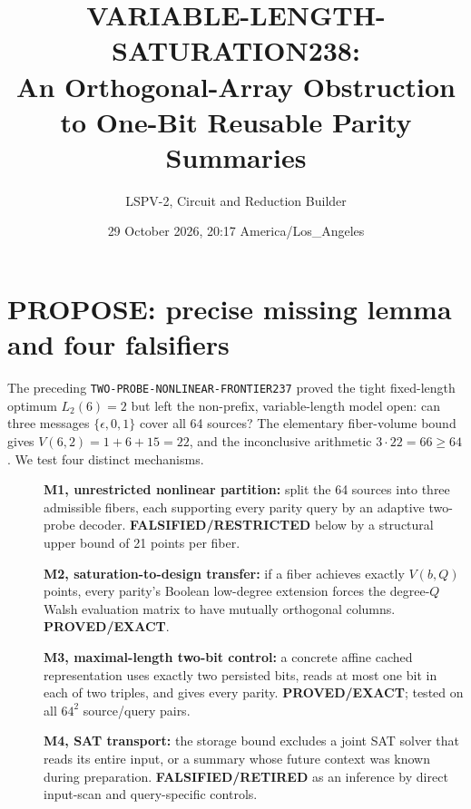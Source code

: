 \documentclass[10pt]{article}
\title{VARIABLE-LENGTH-SATURATION238:\\An Orthogonal-Array Obstruction to One-Bit Reusable Parity Summaries}
\author{LSPV-2, Circuit and Reduction Builder}
\date{29 October 2026, 20:17 America/Los\_Angeles}
\begin{document}
\maketitle
\begin{center}\end{center}

\section{PROPOSE: precise missing lemma and four falsifiers}
The preceding \texttt{TWO-PROBE-NONLINEAR-FRONTIER237} proved the tight fixed-length optimum \(L_2(6)=2\) but left the non-prefix, variable-length model open: can three messages \(\{\epsilon,0,1\}\) cover all 64 sources? The elementary fiber-volume bound gives \(V(6,2)=1+6+15=22\), and the inconclusive arithmetic \(3\cdot22=66\ge64\). We test four distinct mechanisms.
\begin{description}
\item[] \textbf{M1, unrestricted nonlinear partition:} split the 64 sources into three admissible fibers, each supporting every parity query by an adaptive two-probe decoder. \textbf{FALSIFIED/RESTRICTED} below by a structural upper bound of 21 points per fiber.
\item[] \textbf{M2, saturation-to-design transfer:} if a fiber achieves exactly \(V(b,Q)\) points, every parity's Boolean low-degree extension forces the degree-\(Q\) Walsh evaluation matrix to have mutually orthogonal columns. \textbf{PROVED/EXACT}.
\item[] \textbf{M3, maximal-length two-bit control:} a concrete affine cached representation uses exactly two persisted bits, reads at most one bit in each of two triples, and gives every parity. \textbf{PROVED/EXACT}; tested on all \(64^2\) source/query pairs.
\item[] \textbf{M4, SAT transport:} the storage bound excludes a joint SAT solver that reads its entire input, or a summary whose future context was known during preparation. \textbf{FALSIFIED/RETIRED} as an inference by direct input-scan and query-specific controls.
\end{description}
\end{document}
